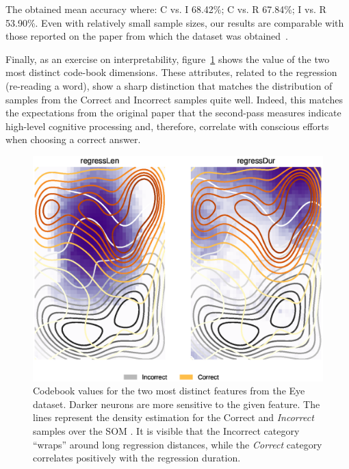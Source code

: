 The obtained mean accuracy where: C vs. I 68.42\%; C vs. R 67.84\%; I vs. R 53.90\%.
Even with relatively small sample sizes, our results are comparable with those
reported on the paper from which the dataset was obtained~\cite{salojarvi2005inferring}.

Finally, as an exercise on interpretability, figure~\ref{fig:eye_distinct_features}
shows the value of the two most distinct code-book dimensions. These attributes,
related to the regression (re-reading a word), show a sharp distinction that
matches the distribution of samples from the Correct and Incorrect samples quite
well.
Indeed, this matches the expectations from the original paper that the second-pass
measures indicate high-level cognitive processing and, therefore, correlate with
conscious efforts when choosing a correct answer.

\begin{figure}[htb]
    \centering
    \includegraphics[width=\textwidth]{images/6_som/eye_regress.eps}
    \caption[Codebook values for the two most distinct features from the Eye dataset.]{
        Codebook values for the two most distinct features from the Eye dataset.
        Darker neurons are more sensitive to the given feature.
        The lines represent the density estimation for the Correct and \emph{Incorrect} samples over the \gls{SOM} .
        It is visible that the Incorrect category ``wraps'' around long regression distances, while the
        \emph{Correct} category correlates positively with the regression duration.
    }
    \label{fig:eye_distinct_features}
\end{figure}


